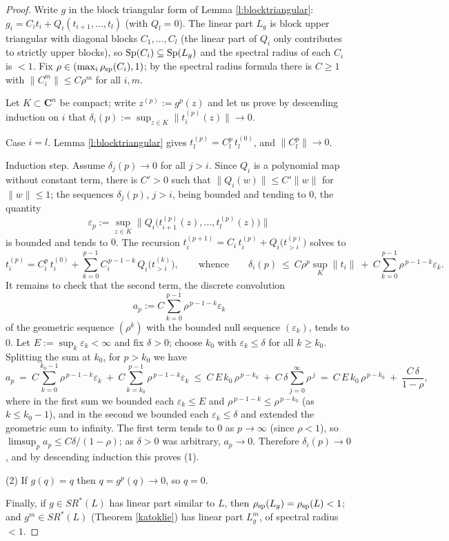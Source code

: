 \documentclass[english,11pt]{amsart}
\theoremstyle{definition}
\theoremstyle{remark}
\numberwithin{equation}{section}
\newcommand{\eps}{\varepsilon}
\newcommand{\C}{\mathbf{C}}
\newcommand{\Sp}{\mathop{\rm Sp}}
\newcommand{\rsp}{\rho_{\rm sp}}
\begin{document}
\begin{proof}
Write $g$ in the block triangular form of Lemma \ref{l:blocktriangular}: $g_i=C_it_i+Q_i(t_{i+1},\dots,t_l)$ (with $Q_l=0$). The linear part $L_g$ is block upper triangular with diagonal blocks $C_1,\dots,C_l$ (the linear part of $Q_i$ only contributes to strictly upper blocks), so $\Sp(C_i)\subseteq\Sp(L_g)$ and the spectral radius of each $C_i$ is $<1$. Fix $\rho\in(\max_i\rsp(C_i),1)$; by the spectral radius formula there is $C\ge1$ with $\|C_i^{m}\|\le C\rho^{m}$ for all $i,m$.

Let $K\subset\C^n$ be compact; write $z^{(p)}:=g^{p}(z)$ and let us prove by descending induction on $i$ that $\delta_i(p):=\sup_{z\in K}\|t_i^{(p)}(z)\|\to0$.

Case $i=l$. Lemma \ref{l:blocktriangular} gives $t_l^{(p)}=C_l^{p}\,t_l^{(0)}$, and $\|C_l^{p}\|\to0$.

Induction step. Assume $\delta_j(p)\to0$ for all $j>i$. Since $Q_i$ is a polynomial map without constant term, there is $C'>0$ such that $\|Q_i(w)\|\le C'\|w\|$ for $\|w\|\le1$; the sequences $\delta_j(p)$, $j>i$, being bounded and tending to $0$, the quantity
\[
\eps_p:=\sup_{z\in K}\big\|Q_i\big(t_{i+1}^{(p)}(z),\dots,t_l^{(p)}(z)\big)\big\|
\]
is bounded and tends to $0$. The recursion $t_i^{(p+1)}=C_i\,t_i^{(p)}+Q_i\big(t^{(p)}_{>i}\big)$ solves to
\[
t_i^{(p)}=C_i^{p}\,t_i^{(0)}+\sum_{k=0}^{p-1}C_i^{\,p-1-k}\,Q_i\big(t^{(k)}_{>i}\big),
\qquad\text{whence}\qquad
\delta_i(p)\ \le\ C\rho^{p}\sup_K\|t_i\|\ +\ C\sum_{k=0}^{p-1}\rho^{\,p-1-k}\eps_k.
\]
It remains to check that the second term, the discrete convolution
\[
a_p:=C\sum_{k=0}^{p-1}\rho^{\,p-1-k}\eps_k
\]
of the geometric sequence $(\rho^k)$ with the bounded null sequence $(\eps_k)$, tends to $0$. Let $E:=\sup_k\eps_k<\infty$ and fix $\delta>0$; choose $k_0$ with $\eps_k\le\delta$ for all $k\ge k_0$. Splitting the sum at $k_0$, for $p>k_0$ we have
\[
a_p\ =\ C\sum_{k=0}^{k_0-1}\rho^{\,p-1-k}\eps_k\ +\ C\sum_{k=k_0}^{p-1}\rho^{\,p-1-k}\eps_k
\ \le\ C\,E\,k_0\,\rho^{\,p-k_0}\ +\ C\,\delta\sum_{j=0}^{\infty}\rho^{\,j}
\ =\ C\,E\,k_0\,\rho^{\,p-k_0}\ +\ \frac{C\,\delta}{1-\rho},
\]
where in the first sum we bounded each $\eps_k\le E$ and $\rho^{\,p-1-k}\le\rho^{\,p-k_0}$ (as $k\le k_0-1$), and in the second we bounded each $\eps_k\le\delta$ and extended the geometric sum to infinity. The first term tends to $0$ as $p\to\infty$ (since $\rho<1$), so $\limsup_p a_p\le C\delta/(1-\rho)$; as $\delta>0$ was arbitrary, $a_p\to0$. Therefore $\delta_i(p)\to0$, and by descending induction this proves (1).

(2) If $g(q)=q$ then $q=g^{p}(q)\to0$, so $q=0$.

Finally, if $g\in SR^*(L)$ has linear part similar to $L$, then $\rsp(L_g)=\rsp(L)<1$; and $g^{m}\in SR^*(L)$ (Theorem \ref{katoklie}) has linear part $L_g^{m}$, of spectral radius $<1$.
\end{proof}
\end{document}
